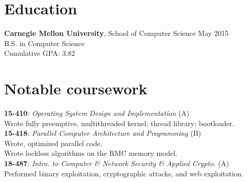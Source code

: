 \documentclass[margin]{res}
\newcommand{\course}[4]{ %
    \textbf{#1}: \textit{#2} (#4)\\
      #3
      \vspace{1em}
    \\}
\begin{document}

\address{
  \href{mailto:joshz@joshz.org}{joshz@joshz.org} \\
  (302) 468-7537
}
\address{  %
  \hfill \href{http://joshz.org}{http://joshz.org} \\
  \hfill
    \href{https://github.com/joshzimmerman}{https://github.com/joshzimmerman}
}

\begin{resume}

\section{Education}
  \textbf{Carnegie Mellon University}, School of Computer Science
    \hfill May 2015\\
  B.S. in Computer Science\\
  Cumulative GPA: 3.82

\section{Notable coursework}
 \course{15-410}{Operating System Design and Implementation}
 {Wrote fully preemptive, multithreaded kernel; thread library; bootloader.}{A}
 \course{15-418}{Parallel Computer Architecture and Programming}
  {Wrote, optimized parallel code. \\
  Wrote lockless algorithms on the RMC memory model.}{B}
  \course{18-487}{Intro. to Computer \& Network Security \& Applied Crypto.}
 {Performed binary exploitation, cryptographic attacks, and web exploitation.}{A}
      \vspace{-2em}



\end{resume}
\end{document}
